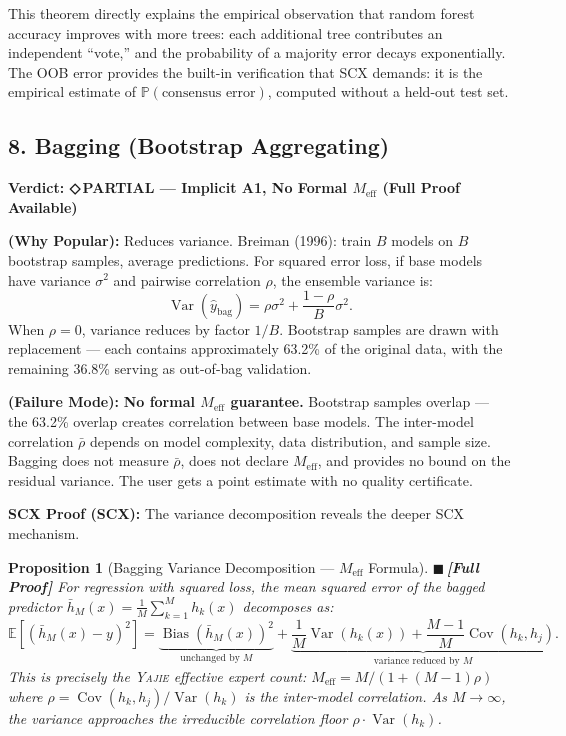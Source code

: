 \documentclass[12pt,a4paper]{article}
\newtheorem{proposition}[theorem]{Proposition}
\theoremstyle{definition}
\newcommand{\rigorFull}{{\color{rigorcolor}$\blacksquare$\,\textbf{[Full Proof]}}}
\newcommand{\weakness}{{\color{weakcolor}\textbf{◇\,PARTIAL}}}
\newcommand{\Yajie}{\textsc{Yajie}}
\newcommand{\SCX}{\textsc{SCX}}
\DeclareMathOperator{\Var}{Var}
\DeclareMathOperator{\Cov}{Cov}
\DeclareMathOperator{\Bias}{Bias}
\newcommand{\E}{\mathbb{E}}
\newcommand{\Pbb}{\mathbb{P}}
\newcommand{\auditHeader}[1]{\medskip\noindent\textbf{\large #1}\medskip}
\newcommand{\whyPopular}{\noindent\textbf{ (Why Popular):} }
\newcommand{\whyFail}{\noindent\textbf{ (Failure Mode):} }
\newcommand{\scxProof}{\noindent\textbf{SCX Proof (SCX):} }
\begin{document}
This theorem directly explains the empirical observation that random forest accuracy improves with more trees: each additional tree contributes an independent ``vote,'' and the probability of a majority error decays exponentially. The OOB error provides the built-in verification that \SCX{} demands: it is the empirical estimate of $\Pbb(\text{consensus error})$, computed without a held-out test set.

\subsection{8. Bagging (Bootstrap Aggregating) }

\auditHeader{Verdict: \weakness{} — Implicit A1, No Formal $M_{\text{eff}}$ (Full Proof Available)}

\whyPopular{} Reduces variance. Breiman (1996): train $B$ models on $B$ bootstrap samples, average predictions. For squared error loss, if base models have variance $\sigma^2$ and pairwise correlation $\rho$, the ensemble variance is:
\[
\Var(\hat{y}_{\text{bag}}) = \rho\sigma^2 + \frac{1-\rho}{B}\sigma^2.
\]
When $\rho = 0$, variance reduces by factor $1/B$. Bootstrap samples are drawn with replacement — each contains approximately 63.2\% of the original data, with the remaining 36.8\% serving as out-of-bag validation.

\whyFail{} \textbf{No formal $M_{\text{eff}}$ guarantee.} Bootstrap samples overlap — the 63.2\% overlap creates correlation between base models. The inter-model correlation $\bar{\rho}$ depends on model complexity, data distribution, and sample size. Bagging does not measure $\bar{\rho}$, does not declare $M_{\text{eff}}$, and provides no bound on the residual variance. The user gets a point estimate with no quality certificate.

\scxProof{} The variance decomposition reveals the deeper \SCX{} mechanism.

\begin{proposition}[Bagging Variance Decomposition — $M_{\text{eff}}$ Formula]\label{prop:bagging_var}
\rigorFull
For regression with squared loss, the mean squared error of the bagged predictor $\bar{h}_M(x) = \frac{1}{M}\sum_{k=1}^M h_k(x)$ decomposes as:
\begin{equation}\label{eq:bagging_decomp}
    \E[(\bar{h}_M(x) - y)^2] = \underbrace{\Bias(\bar{h}_M(x))^2}_{\text{unchanged by } M} + \underbrace{\frac{1}{M}\Var(h_k(x)) + \frac{M-1}{M}\Cov(h_k, h_j)}_{\text{variance reduced by } M}.
\end{equation}
This is precisely the \Yajie{} effective expert count: $M_{\text{eff}} = M / (1 + (M-1)\rho)$ where $\rho = \Cov(h_k, h_j)/\Var(h_k)$ is the inter-model correlation. As $M \to \infty$, the variance approaches the irreducible correlation floor $\rho \cdot \Var(h_k)$.
\end{proposition}
\end{document}
